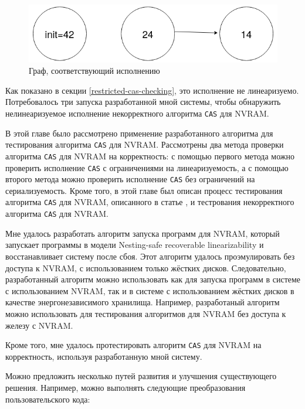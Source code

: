 \documentclass[times,specification,annotation]{itmo-student-thesis}
\begin{document}
\begin{figure}[H]
  \centering
  \caption{Граф, соответствующий исполнению}
  \label{incorrect-cas-pic}
  \includegraphics[width=\linewidth]{incorrect_cas_graph.png}
\end{figure}

Как показано в секции \ref{restricted-cas-checking}, это исполнение не линеаризуемо. Потребовалось три запуска разработанной мной системы, чтобы обнаружить нелинеаризуемое исполнение некорректного алгоритма \texttt{CAS} для NVRAM.

\chapterconclusion

В этой главе было рассмотрено применение разработанного алгоритма для тестирования алгоритма \texttt{CAS} для NVRAM. Рассмотрены два метода проверки алгоритма \texttt{CAS} для NVRAM на корректность: с помощью первого метода можно проверить исполнение \texttt{CAS} с ограничениями на линеаризуемость, а с помощью второго метода можно проверить исполнение \texttt{CAS} без ограничений на сериализуемость. Кроме того, в этой главе был описан процесс тестирования алгоритма \texttt{CAS} для NVRAM, описанного в статье \cite{attiya2018nesting}, и тестрования некорректного алгоритма \texttt{CAS} для NVRAM.

\startconclusionpage

Мне удалось разработать алгоритм запуска программ для NVRAM, который запускает программы в модели Nesting-safe recoverable linearizability и восстанавливает систему после сбоя. Этот алгоритм удалось проэмулировать без доступа к NVRAM, с использованием только жёстких дисков. Следовательно, разработанный алгоритм можно  использовать как для запуска программ в системе с использованием NVRAM, так и в системе с использованием жёстких дисков в качестве энергонезависимого хранилища. Например, разработаный алгоритм можно использовать для тестирования алгоритмов для NVRAM без доступа к железу с NVRAM.

Кроме того, мне удалось протестировать алгоритм \texttt{CAS} для NVRAM на корректность, используя разработанную мной систему.

\bigbreak

Можно предложить несколько путей развития и улучшения существующего решения. Например, можно выполнять следующие преобразования пользовательского кода:
\end{document}
